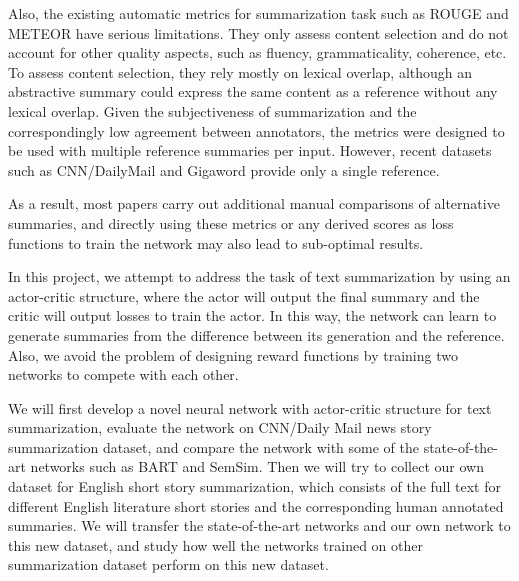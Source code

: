 \documentclass[11pt,a4paper]{article}
\begin{document}
Also, the existing automatic metrics for summarization task such as ROUGE and METEOR have serious limitations\cite{nlpprogress}. They only assess content selection and do not account for other quality aspects, such as fluency, grammaticality, coherence, etc. To assess content selection, they rely mostly on lexical overlap, although an abstractive summary could express the same content as a reference without any lexical overlap. Given the subjectiveness of summarization and the correspondingly low agreement between annotators, the metrics were designed to be used with multiple reference summaries per input. However, recent datasets such as CNN/DailyMail and Gigaword provide only a single reference.

As a result, most papers carry out additional manual comparisons of alternative summaries, and directly using these metrics or any derived scores as loss functions to train the network may also lead to sub-optimal results. 

In this project, we attempt to address the task of text summarization by using an actor-critic structure, where the actor will output the final summary and the critic will output losses to train the actor. In this way, the network can learn to generate summaries from the difference between its generation and the reference. Also, we avoid the problem of designing reward functions by training two networks to compete with each other.

We will first develop a novel neural network with actor-critic structure for text summarization, evaluate the network on CNN/Daily Mail news story summarization dataset\cite{nallapati-etal-2016-abstractive}, and compare the network with some of the state-of-the-art networks such as BART\cite{lewis2019bart} and SemSim\cite{yoon2020learning}. Then we will try to collect our own dataset for English short story summarization, which consists of the full text for different English literature short stories and the corresponding human annotated summaries. We will transfer the state-of-the-art networks and our own network to this new dataset, and study how well the networks trained on other summarization dataset perform on this new dataset.
\end{document}
